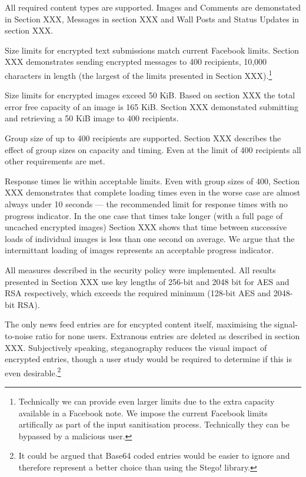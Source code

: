 \begin{desc}

    \item[Requirement 1] All required content types are supported. Images and Comments are demonstated in Section XXX, Messages in section XXX and Wall Posts and Status Updates in section XXX.
    
    \item[Requirement 2] Size limits for encrypted text submissions match current Facebook limits. Section XXX demonstrates sending encrypted messages to 400 recipients, 10,000 characters in length (the largest of the limits presented in Section XXX).\footnote{Technically we can provide even larger limits due to the extra capacity available in a Facebook note. We impose the current Facebook limits artifically as part of the input sanitisation process. Technically they can be bypassed by a malicious user.}

    \item[Requirement 3] Size limits for encrypted images exceed 50 KiB. Based on section XXX the total error free capacity of an image is 165 KiB. Section XXX demonstated submitting and retrieving a 50 KiB image to 400 recipients.

    \item[Requirement 4] Group size of up to 400 recipients are supported. Section XXX describes the effect of group sizes on capacity and timing. Even at the limit of 400 recipients all other requirements are met. 
    
    \item[Requirement 5] Response times lie within acceptable limits. Even with group sizes of 400, Section XXX demonstrates that complete loading times even in the worse case are almost always under 10 seconds --- the recommended limit for response times with no progress indicator. In the one case that times take longer (with a full page of uncached encrypted images) Section XXX shows that time between successive loads of individual images is less than one second on average. We argue that the intermittant loading of images represents an acceptable progress indicator.

    \item[Requirement 6] All measures described in the security policy were implemented. All results presented in Section XXX use key lengths of 256-bit and 2048 bit for AES and RSA respectively, which exceeds the required minimum (128-bit AES and 2048-bit RSA).

    \item[Requirement 7] The only news feed entries are for encypted content itself, maximising the signal-to-noise ratio for none users. Extranous entries are deleted as described in section XXX. Subjectively speaking, steganography reduces the visual impact of encrypted entries, though a user study would be required to determine if this is even desirable.\footnote{It could be argued that Base64 coded entries would be easier to ignore and therefore represent a better choice than using the Stego! library.}


\end{desc}

